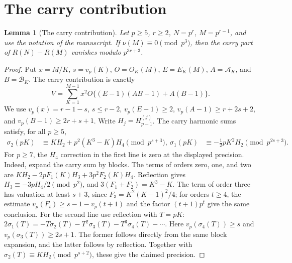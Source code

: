 \documentclass[11pt]{amsart}
\newtheorem{lemma}[theorem]{Lemma}
\theoremstyle{definition}
\theoremstyle{remark}
\begin{document}
\section{The carry contribution}\label{sec:carry-new}
\begin{lemma}[The carry contribution]\label{lem:carry-new}
Let $p\ge5$, $r\ge2$, $N=p^r$, $M=p^{r-1}$, and use the notation of the manuscript.
If $\nu(M)\equiv0\pmod{p^3}$, then the carry part of
$R(N)-R(M)$ vanishes modulo $p^{3r+3}$.
\end{lemma}
\begin{proof}
Put $x=M/K$, $s=v_p(K)$, $O=O_K(M)$, $E=E_K(M)$,
$A=\mathcal A_K$, and $B=\mathcal B_K$.
The carry contribution is exactly
\[
 V=\sum_{K=1}^{M-1}x^2O\{(E-1)(AB-1)+A(B-1)\}.
\]
We use $v_p(x)=r-1-s$, $s\le r-2$, $v_p(E-1)\ge2$,
$v_p(A-1)\ge r+2s+2$, and $v_p(B-1)\ge2r+s+1$.
Write $H_j=H_{p-1}^{(j)}$.
The carry harmonic sums satisfy, for all $p\ge5$,
\begin{align}
 \sigma_2(pK)&\equiv K H_2+p^2(K^3-K)H_4\pmod{p^{s+3}},\
 \sigma_1(pK)&\equiv-\tfrac12pK^2H_2\pmod{p^{2s+3}}.
\end{align}
For $p\ge7$, the $H_4$ correction in the first line is zero at the displayed precision.
Indeed, expand the carry sum by blocks. The terms of orders zero, one, and two are
$KH_2-2pF_1(K)H_3+3p^2F_2(K)H_4$.
Reflection gives $H_3\equiv-3pH_4/2\pmod{p^2}$, and
$3(F_1+F_2)=K^3-K$.
The term of order three has valuation at least $s+3$, since
$F_3=K^2(K-1)^2/4$; for orders $t\ge4$, the estimate
$v_p(F_t)\ge s-1-v_p(t+1)$ and the factor $(t+1)p^t$ give the same conclusion.
For the second line use reflection with $T=pK$:
$2\sigma_1(T)=-T\sigma_2(T)-T^2\sigma_3(T)-T^3\sigma_4(T)-\cdots$.
Here $v_p(\sigma_4(T))\ge s$ and $v_p(\sigma_3(T))\ge2s+1$.
The former follows directly from the same block expansion, and the latter follows by reflection.
Together with $\sigma_2(T)\equiv KH_2\pmod{p^{s+2}}$, these give the claimed precision.


\end{proof}
\end{document}
